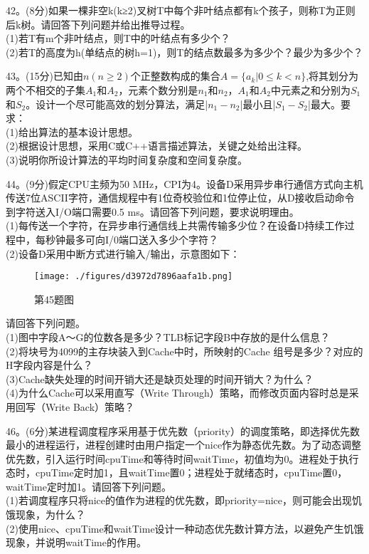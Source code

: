 42。(8分)如果一棵非空k(k≥2)叉树T中每个非叶结点都有k个孩子，则称T为正则后k树。请回答下列问题并给出推导过程。 \\
(1)若T有m个非叶结点，则T中的叶结点有多少个？ \\
(2)若T的高度为h(单结点的树h=1)，则T的结点数最多为多少个？最少为多少个？

43。(15分)已知由$n(n \geqslant 2)$个正整数构成的集合$A=\{a_k|0\leqslant k<n\}$,将其划分为两个不相交的子集$A_1$和$A_2$，元素个数分别是$n_1$和$n_2$，$A_1$和$A_2$中元素之和分别为$S_1$和$S_2$。设计一个尽可能高效的划分算法，满足|$n_1-n_2$|最小且|$S_1-S_2$|最大。要求： \\
(1)给出算法的基本设计思想。 \\
(2)根据设计思想，采用C或C++语言描述算法，关键之处给出注释。 \\
(3)说明你所设计算法的平均时间复杂度和空间复杂度。

44。(9分)假定CPU主频为50 MHz，CPI为4。设备D采用异步串行通信方式向主机传送7位ASCII字符，通信规程中有1位奇校验位和1位停止位，从D接收启动命令到字符送入I/O端口需要0.5 ms。请回答下列问题，要求说明理由。 \\
(1)每传送一个字符，在异步串行通信线上共需传输多少位？在设备D持续工作过程中，每秒钟最多可向I/0端口送入多少个字符？ \\
(2)设备D采用中断方式进行输入/输出，示意图如下：
\begin{figure}[ht]
\centering
\texttt{[image: ./figures/d3972d7896aafa1b.png]}
\caption{第45题图} \label{fig_CSN16_5}
\end{figure}
请回答下列问题。 \\
(1)图中字段A～G的位数各是多少？TLB标记字段B中存放的是什么信息？ \\
(2)将块号为4099的主存块装入到Cache中时，所映射的Cache 组号是多少？对应的H字段内容是什么？ \\
(3)Cache缺失处理的时间开销大还是缺页处理的时间开销大？为什么？ \\
(4)为什么Cache可以采用直写（Write Through）策略，而修改页面内容时总是采用回写（Write Back）策略？

46。(6分)某进程调度程序采用基于优先数（priority）的调度策略，即选择优先数最小的进程运行，进程创建时由用户指定一个nice作为静态优先数。为了动态调整优先数，引入运行时间cpuTime和等待时间waitTime，初值均为0。进程处于执行态时，cpuTime定时加1，且waitTime置0；进程处于就绪态时，cpuTime置0，waitTime定时加1。请回答下列问题。 \\
(1)若调度程序只将nice的值作为进程的优先数，即priority=nice，则可能会出现饥饿现象，为什么？ \\
(2)使用nice、cpuTime和waitTime设计一种动态优先数计算方法，以避免产生饥饿现象，并说明waitTime的作用。

